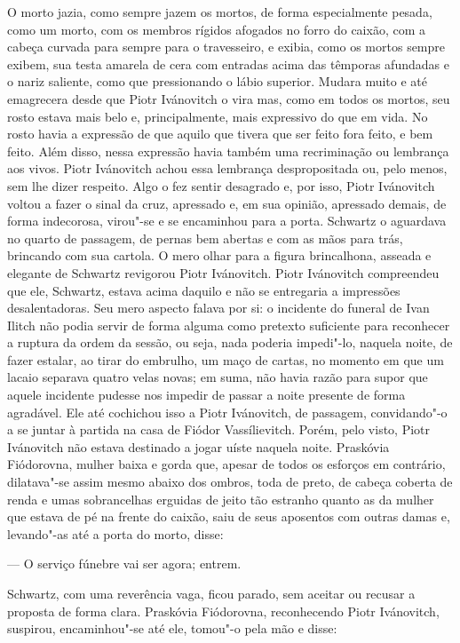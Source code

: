 O morto jazia, como sempre jazem os mortos, de forma especialmente
pesada, como um morto, com os membros rígidos afogados no forro do
caixão, com a cabeça curvada para sempre para o travesseiro, e exibia,
como os mortos sempre exibem, sua testa amarela de cera com entradas
acima das têmporas afundadas e o nariz saliente, como que pressionando o
lábio superior. Mudara muito e até emagrecera desde que Piotr Ivánovitch
o vira mas, como em todos os mortos, seu rosto estava mais belo e,
principalmente, mais expressivo do que em vida. No rosto havia a
expressão de que aquilo que tivera que ser feito fora feito, e bem
feito. Além disso, nessa expressão havia também uma recriminação ou
lembrança aos vivos. Piotr Ivánovitch achou essa lembrança
despropositada ou, pelo menos, sem lhe dizer respeito. Algo o fez sentir
desagrado e, por isso, Piotr Ivánovitch voltou a fazer o sinal da cruz,
apressado e, em sua opinião, apressado demais, de forma indecorosa,
virou"-se e se encaminhou para a porta. Schwartz o aguardava no quarto de
passagem, de pernas bem abertas e com as mãos para trás, brincando com
sua cartola. O mero olhar para a figura brincalhona, asseada e elegante
de Schwartz revigorou Piotr Ivánovitch. Piotr Ivánovitch compreendeu que
ele, Schwartz, estava acima daquilo e não se entregaria a impressões
desalentadoras. Seu mero aspecto falava por si: o incidente do funeral
de Ivan Ilitch não podia servir de forma alguma como pretexto suficiente
para reconhecer a ruptura da ordem da sessão, ou seja, nada poderia
impedi"-lo, naquela noite, de fazer estalar, ao tirar do embrulho, um
maço de cartas, no momento em que um lacaio separava quatro velas novas;
em suma, não havia razão para supor que aquele incidente pudesse nos
impedir de passar a noite presente de forma agradável. Ele até cochichou
isso a Piotr Ivánovitch, de passagem, convidando"-o a se juntar à partida
na casa de Fiódor Vassílievitch. Porém, pelo visto, Piotr Ivánovitch não
estava destinado a jogar uíste naquela noite. Praskóvia Fiódorovna,
mulher baixa e gorda que, apesar de todos os esforços em contrário,
dilatava"-se assim mesmo abaixo dos ombros, toda de preto, de cabeça
coberta de renda e umas sobrancelhas erguidas de jeito tão estranho
quanto as da mulher que estava de pé na frente do caixão, saiu de seus
aposentos com outras damas e, levando"-as até a porta do morto, disse:

--- O serviço fúnebre vai ser agora; entrem.

Schwartz, com uma reverência vaga, ficou parado, sem aceitar ou recusar
a proposta de forma clara. Praskóvia Fiódorovna, reconhecendo Piotr
Ivánovitch, suspirou, encaminhou"-se até ele, tomou"-o pela mão e disse:

